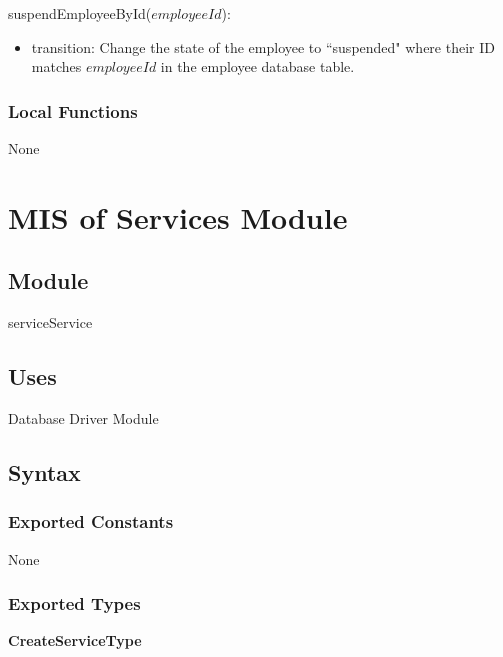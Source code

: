 \documentclass[12pt, titlepage]{article}
\begin{document}
\noindent suspendEmployeeById($employeeId$):
\begin{itemize}
	\item transition: Change the state of the employee to ``suspended" where their ID matches $employeeId$ in
	      the employee database table.
\end{itemize}

\subsubsection{Local Functions}

None

\newpage

\section{MIS of Services Module} \label{mServices}
\subsection{Module}

serviceService

\subsection{Uses}

Database Driver Module

\subsection{Syntax}

\subsubsection{Exported Constants}

None

\subsubsection{Exported Types}

\textbf{CreateServiceType}
\end{document}
